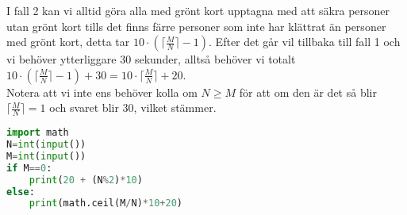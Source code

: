 \documentclass{article}
\begin{document}
I fall 2 kan vi alltid göra alla med grönt kort upptagna med att säkra personer utan grönt kort tills det finns färre personer som inte har klättrat än personer med grönt kort, detta tar $10 \cdot (\lceil \frac{M}{N} \rceil -1)$. Efter det går vil tillbaka till fall 1 och vi behöver ytterliggare 30 sekunder, alltså behöver vi totalt $10 \cdot (\lceil \frac{M}{N} \rceil -1) +30 = 10 \cdot \lceil \frac{M}{N} \rceil + 20$.\\ Notera att vi inte ens behöver kolla om $N\geq M$ för att om den är det så blir $\lceil \frac{M}{N} \rceil=1$ och svaret blir 30, vilket stämmer.  
\begin{lstlisting}[language=Python, caption=En lösning i python]
import math
N=int(input())
M=int(input())
if M==0:
    print(20 + (N%2)*10)
else:
    print(math.ceil(M/N)*10+20)
\end{lstlisting}
\end{document}

